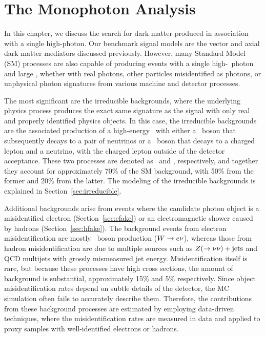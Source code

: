 \chapter{The Monophoton Analysis}
\label{chap:analysis}

In this chapter, we discuss the search for dark matter produced in association with a single high-\pt photon.
Our benchmark signal models are the vector and axial dark matter mediators discussed previously. 
However, many Standard Model (SM) processes are also capable of producing events with a single high-\pt\ photon and large \met, whether with real photons, other particles misidentified as photons, or unphysical photon signatures from various  machine and detector processes.


The most significant are the irreducible backgrounds, where the underlying physics process produces the exact same signature as the signal with only real and properly identified physics objects.
In this case, the irreducible backgrounds are the associated production of a high-energy \Pgg\ with either a \PZ\ boson that subsequently decays to a pair of neutrinos or a \PW\ boson that decays to a charged lepton and a neutrino, with the charged lepton outside of the detector acceptance.
These two processes are denoted as \zinvg\ and \wlng, respectively, and together they account for approximately 70\% of the SM background, with 50\% from the former and 20\% from the latter.
The modeling of the irreducible backgrounds is explained in Section~\ref{sec:irreducible}.

Additional backgrounds arise from events where the candidate photon object is a misidentified electron (Section~\ref{sec:efake}) or an electromagnetic shower caused by hadrons (Section~\ref{sec:hfake}). 
The background events from electron misidentification are mostly \PW\ boson production (${W}\rightarrow {e}\nu$), whereas those from hadron misidentification are due to multiple sources such as ${Z}(\rightarrow\nu\nu)+\text{jets}$ and QCD multijets with grossly mismeasured jet energy. 
Misidentification itself is rare, but because these processes have high cross sections, the amount of background is substantial, approximately 15\% and 5\% respectively.
Since object misidentification rates depend on subtle details of the detector, the MC simulation often fails to accurately describe them.
Therefore, the contributions from these background processes are estimated by employing data-driven techniques, where the misidentification rates are measured in data and applied to proxy samples with well-identified electrons or hadrons.

